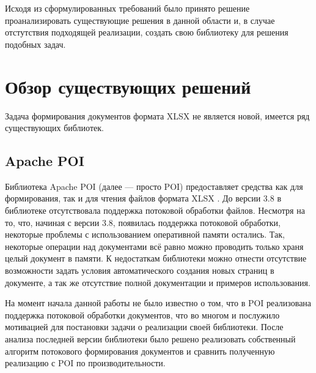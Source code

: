 \documentclass[14pt]{matmex-diploma}
\begin{document}
Исходя из сформулированных требований было принято решение проанализировать существующие решения в данной области и, в случае отстутствия подходящей реализации, создать свою библиотеку для решения подобных задач.
\section{Обзор существующих решений}
Задача формирования документов формата XLSX не является новой, имеется ряд существующих библиотек.
\subsection{Apache POI}
    Библиотека Apache POI \cite{poi} (далее --- просто POI) предоставляет средства как для формирования, так и для чтения файлов формата XLSX . До версии 3.8 в библиотеке отсутствовала поддержка потоковой обработки файлов. Несмотря на то, что, начиная с версии 3.8, появилась поддержка потоковой обработки, некоторые проблемы с использованием оперативной памяти остались. Так, некоторые операции над документами всё равно можно проводить только храня целый документ в памяти. К недостаткам библиотеки можно отнести отсутствие возможности задать условия автоматического создания новых страниц в документе, а так же отсутствие полной документации и примеров использования.
    
    На момент начала данной работы не было известно о том, что в POI реализована поддержка потоковой обработки документов, что во многом и послужило мотивацией для постановки задачи о реализации своей библиотеки. После анализа последней версии библиотеки было решено реализовать собственный алгоритм потокового формирования документов и сравнить полученную реализацию с POI по производительности.
    
\end{document}

